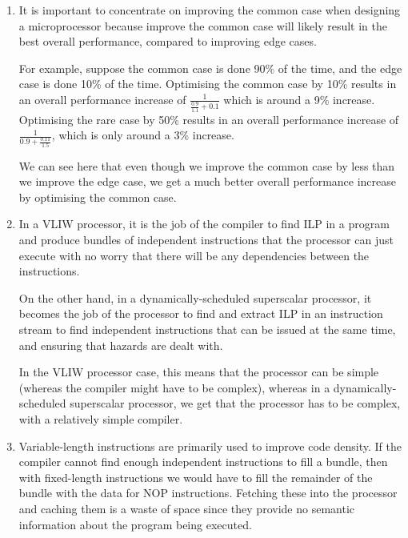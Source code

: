 


\begin{enumerate}[label=(\alph*)]
  \item

    It is important to concentrate on improving the common case when designing a microprocessor because improve the common case will likely result in the best overall performance, compared to improving edge cases.

    For example, suppose the common case is done 90\% of the time, and the edge case is done 10\% of the time. Optimising the common case by 10\% results in an overall performance increase of $\frac{1}{\frac{0.9}{1.1} + 0.1}$ which is around a 9\% increase. Optimising the rare case by 50\% results in an overall performance increase of $\frac{1}{0.9 + \frac{0.11}{1.5}}$, which is only around a 3\% increase.

    We can see here that even though we improve the common case by less than we improve the edge case, we get a much better overall performance increase by optimising the common case.

  \item
    In a VLIW processor, it is the job of the compiler to find ILP in a program and produce bundles of independent instructions that the processor can just execute with no worry that there will be any dependencies between the instructions.

    On the other hand, in a dynamically-scheduled superscalar processor, it becomes the job of the processor to find and extract ILP in an instruction stream to find independent instructions that can be issued at the same time, and ensuring that hazards are dealt with.

    In the VLIW processor case, this means that the processor can be simple (whereas the compiler might have to be complex), whereas in a dynamically-scheduled superscalar processor, we get that the processor has to be complex, with a relatively simple compiler.

  \item
    Variable-length instructions are primarily used to improve code density. If the compiler cannot find enough independent instructions to fill a bundle, then with fixed-length instructions we would have to fill the remainder of the bundle with the data for NOP instructions. Fetching these into the processor and caching them is a waste of space since they provide no semantic information about the program being executed.


\end{enumerate}
